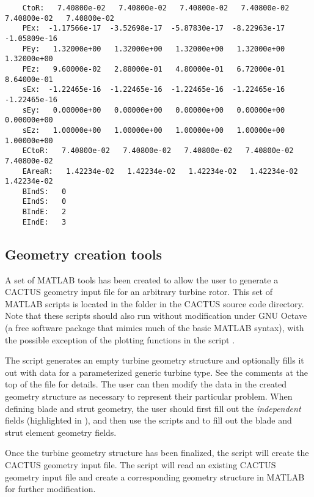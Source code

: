 \begin{lstlisting}
    CtoR:   7.40800e-02   7.40800e-02   7.40800e-02   7.40800e-02   7.40800e-02   7.40800e-02
    PEx:  -1.17566e-17  -3.52698e-17  -5.87830e-17  -8.22963e-17  -1.05809e-16
    PEy:   1.32000e+00   1.32000e+00   1.32000e+00   1.32000e+00   1.32000e+00
    PEz:   9.60000e-02   2.88000e-01   4.80000e-01   6.72000e-01   8.64000e-01
    sEx:  -1.22465e-16  -1.22465e-16  -1.22465e-16  -1.22465e-16  -1.22465e-16
    sEy:   0.00000e+00   0.00000e+00   0.00000e+00   0.00000e+00   0.00000e+00
    sEz:   1.00000e+00   1.00000e+00   1.00000e+00   1.00000e+00   1.00000e+00
    ECtoR:   7.40800e-02   7.40800e-02   7.40800e-02   7.40800e-02   7.40800e-02
    EAreaR:   1.42234e-02   1.42234e-02   1.42234e-02   1.42234e-02   1.42234e-02
    BIndS:   0
    EIndS:   0
    BIndE:   2
    EIndE:   3
\end{lstlisting}

\subsection{Geometry creation tools}
\label{sec:geomery_creation_tools}
A set of MATLAB tools has been created to allow the user to generate a CACTUS geometry input file for an arbitrary turbine rotor. This set of MATLAB scripts is located in the  folder in the CACTUS source code directory. Note that these scripts should also run without modification under GNU Octave (a free software package that mimics much of the basic MATLAB syntax), with the possible exception of the plotting functions in the script .

The script  generates an empty turbine geometry structure and optionally fills it out with data for a parameterized generic turbine type. See the comments at the top of the file for details. The user can then modify the data in the created geometry structure as necessary to represent their particular problem. When defining blade and strut geometry, the user should first fill out the \emph{independent} fields (highlighted in ), and then use the scripts  and  to fill out the blade and strut element geometry fields.

Once the turbine geometry structure has been finalized, the script  will create the CACTUS geometry input file. The script  will read an existing CACTUS geometry input file and create a corresponding geometry structure in MATLAB for further modification.

